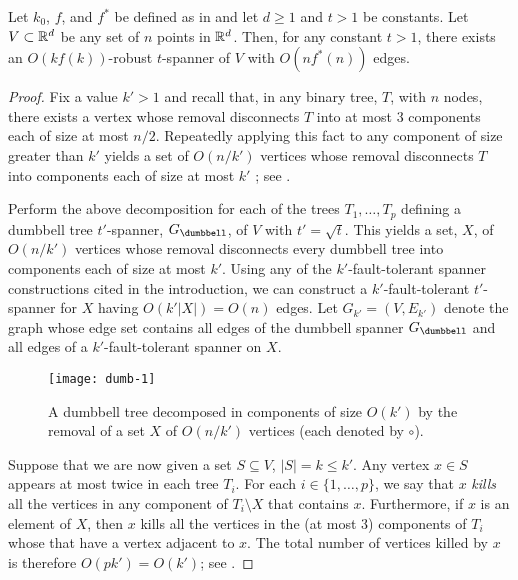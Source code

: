 \documentclass{sig-alternate}
\makeatletter
\def\ScaleIfNeeded{%
\ifdim\Gin@nat@width>.97\linewidth
.97\linewidth
\else
\Gin@nat@width
\fi
}
\makeatother
\begin{document}
\begin{thm}
  Let $k_0$, $f$, and $f^*$ be defined as in  and let
  $d\ge 1$ and $t>1$ be constants.  Let $V\subset \mathbb{R}^d$ be any set of
  $n$ points in $\mathbb{R}^d$.  Then, for any constant $t>1$,  there exists an
  $O(kf(k))$-robust $t$-spanner of $V$ with $O(nf^*(n))$ edges.
\end{thm}

\begin{proof} 
  Fix a value $k'>1$ and recall that, in any binary tree, $T$, with $n$
  nodes, there exists a vertex whose removal disconnects $T$ into at most
  3 components each of size at most $n/2$.  Repeatedly applying this fact
  to any component of size greater than $k'$ yields a set of $O(n/k')$
  vertices whose removal disconnects $T$ into components each of size
  at most $k'$ \cite[Lemma~12.1.5]{ns07}; see .

  Perform the above decomposition for each of the trees $T_1,\ldots,T_p$
  defining a dumbbell tree $t'$-spanner, $G_\dumbbell$, of $V$ with
  $t'=\sqrt{t}$.  This yields a set, $X$, of $O(n/k')$ vertices
  whose removal disconnects every dumbbell tree into components
  each of size at most $k'$.  Using any of the $k'$-fault-tolerant
  spanner constructions cited in the introduction, we can construct a
  $k'$-fault-tolerant $t'$-spanner for $X$ having $O(k'|X|)=O(n)$ edges.
  Let $G_{k'}=(V,E_{k'})$ denote the graph whose edge set contains
  all edges of the dumbbell spanner $G_\dumbbell$ and all edges of a
  $k'$-fault-tolerant spanner on $X$.

  \begin{figure}
    \begin{center}
      \texttt{[image: dumb-1]}
    \end{center}
    \caption{A dumbbell tree decomposed in components of size $O(k')$
    by the removal of a set $X$ of $O(n/k')$ vertices (each denoted
    by $\circ$).}
  \end{figure}

  Suppose that we are now given a set $S\subseteq V$, $|S|=k\le k'$.
  Any vertex $x\in S$ appears at most twice in each tree $T_i$.  For each
  $i\in\{1,\ldots,p\}$, we say that $x$ \emph{kills} all the vertices
  in any component of $T_i\setminus X$ that contains $x$.  Furthermore,
  if $x$ is an element of $X$, then $x$ kills all the vertices in the (at
  most 3) components of $T_i$ whose that have a vertex adjacent to $x$.
  The total number of vertices killed by $x$ is therefore $O(pk')=O(k')$;
  see .


\end{proof}
\end{document}
